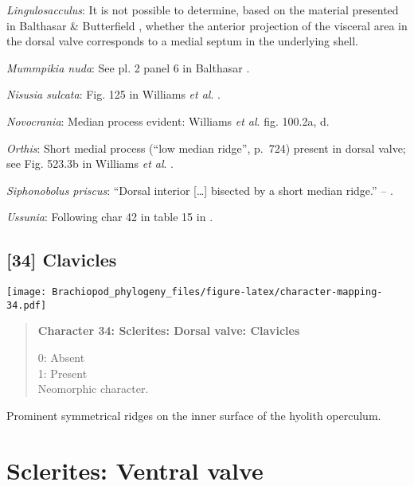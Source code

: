 \documentclass[openany]{book}
\theoremstyle{definition}
\theoremstyle{definition}
\theoremstyle{definition}
\theoremstyle{remark}
\begin{document}
\hypertarget{Lingulosacculus-coding-33}{}
\emph{Lingulosacculus}: It is not possible to determine, based on the
material presented in Balthasar \& Butterfield
\citeyearpar{Balthasar2009EarlyCambrian}, whether the anterior
projection of the visceral area in the dorsal valve corresponds to a
medial septum in the underlying shell.

\hypertarget{Mummpikia_nuda-coding-33}{}
\emph{Mummpikia nuda}: See pl. 2 panel 6 in Balthasar
\citeyearpar{Balthasar2008iMummpikia}.

\hypertarget{Nisusia_sulcata-coding-33}{}
\emph{Nisusia sulcata}: Fig. 125 in Williams \emph{et al}.
\citeyearpar{Williams2000LinguliformeaCraniiformea}.

\hypertarget{Novocrania-coding-33}{}
\emph{Novocrania}: Median process evident: Williams \emph{et al}.
\citeyearpar{Williams2000LinguliformeaCraniiformea} fig. 100.2a, d.

\hypertarget{Orthis-coding-33}{}
\emph{Orthis}: Short medial process (``low median ridge'', p.~724)
present in dorsal valve; see Fig. 523.3b in Williams \emph{et al}.
\citeyearpar{Williams2000LinguliformeaCraniiformea}.

\hypertarget{Siphonobolus_priscus-coding-33}{}
\emph{Siphonobolus priscus}: ``Dorsal interior {[}\ldots{}{]} bisected
by a short median ridge.'' -- \citet{Popov2009Earlyontogeny}.

\hypertarget{Ussunia-coding-33}{}
\emph{Ussunia}: Following char 42 in table 15 in
\citet{Williams2000LinguliformeaCraniiformea}.

\subsection*{{[}34{]} Clavicles}\label{clavicles}

\texttt{[image: Brachiopod\_phylogeny\_files/figure-latex/character-mapping-34.pdf]}

\begin{quote}
\textbf{Character 34: Sclerites: Dorsal valve: Clavicles}

0: Absent\\
1: Present\\
Neomorphic character.
\end{quote}

Prominent symmetrical ridges on the inner surface of the hyolith
operculum.

\section{Sclerites: Ventral valve}\label{sclerites-ventral-valve}
\end{document}
